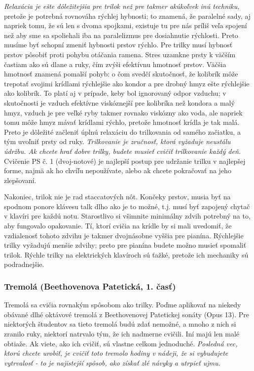 \emph{Relaxácia je ešte dôležitejšia pre trilok než pre takmer akúkoľvek inú techniku,} pretože je potrebná rovnováha rýchlej hybnosti; to znamená, že paralelné sady, aj napriek tomu, že sú len s dvoma spojkami, existuje tu pre nás príliš veľa spojení než aby sme sa spoliehali iba na paralelizmus pre dosiahnutie rýchlosti. Preto musíme byť schopní zmeniť hybnosti prstov rýchlo. Pre trilky musí hybnosť prstov pôsobiť proti pohybu otáčania ramena. Stres uzamkne prsty k väčším častiam ako sú dlane a ruky, čím zvýši efektívnu hmotnosť prstov. Väčšia hmotnosť znamená pomalší pohyb: o čom svedčí skutočnosť, že kolibrík môže trepotať svojimi krídlami rýchlejšie ako kondor a pre drobný hmyz ešte rýchlejšie ako kolibrík. To platí aj v prípade, keby bol ignorovaný odpor vzduchu; v skutočnosti je vzduch efektívne viskóznejší pre kolibríka než kondora a malý hmyz, vzduch je pre veľké ryby takmer rovnako viskózny ako voda, ale napriek tomu môže hmyz mávať krídlami rýchlo, pretože hmotnosť krídla je tak malá. Preto je dôležité začleniť úplnú relaxáciu do trilkovania od samého začiatku, a tým uvoľniť prsty od ruky. \emph{Trilkovanie je zručnosť, ktorá vyžaduje neustálu údržbu. Ak chcete hrať dobre trilky, budete musieť cvičiť trilkovanie každý deň.} Cvičenie PS č. 1 (dvoj-notové) je najlepší postup pre udržanie trilku v najlepšej forme, najmä ak ho chvíľu nepoužívate, alebo ak chcete pokračovať na jeho zlepšovaní. 

Nakoniec, trilok nie je rad staccatových nôt. Končeky prstov, musia byť na spodnom ponore klávesu talk dlho ako je to možné, t.j. musí byť zapojený chytač v klavíri pre každú notu. Starostlivo si všimnite minimálny zdvih potrebný na to, aby fungovalo opakovanie. Tí, ktorí cvičia na krídle by si mali uvedomiť, že vzdialenosť tohoto zdvihu je takmer dvojnásobne vyššia pre pianína. Rýchlejšie trilky vyžadujú menšie zdvihy; preto pre pianína budete možno musieť spomaliť trilok. Rýchle trilky na elektrických klavíroch sú ťažké, pretože ich mechaniky sú podradnejšie.

\subsubsection{Tremolá (Beethovenova Patetická, 1. časť)}
Tremolá sa cvičia rovnakým spôsobom ako trilky. Poďme aplikovať na niekedy obávané dlhé oktávové tremolá z Beethovenovej Patetickej sonáty (Opus 13). Pre niektorých študentov sa tieto tremolá budú zdať nemožné, a mnoho z nich si zranilo ruky, niektorí natrvalo tým, že ich nadmerne cvičili. Iní majú len malé obtiaže. Ak viete, ako ich cvičiť, sú vlastne celkom jednoduché. \emph{Posledná vec, ktorú chcete urobiť, je cvičiť toto tremolo hodiny v nádeji, že si vybudujete vytrvalosť - to je najistejší spôsob, ako získať zlé návyky a utrpieť ujmu.}

